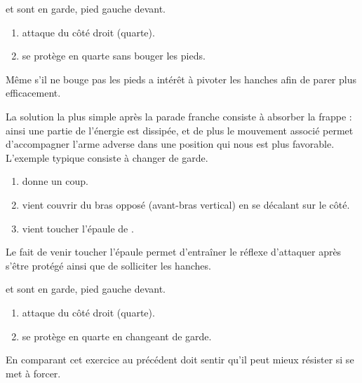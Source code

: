 \begin{exercice}

\A et \D sont en garde, pied gauche devant.

\begin{enumerate}
	\item \A attaque \D du côté droit (quarte).
	
	\item \D se protège en quarte sans bouger les pieds.
\end{enumerate}

Même s'il ne bouge pas les pieds \D a intérêt à pivoter les hanches afin de parer plus efficacement.

\end{exercice}


La solution la plus simple après la parade franche consiste à absorber la frappe : ainsi une partie de l'énergie est dissipée, et de plus le mouvement associé permet d'accompagner l'arme adverse dans une position qui nous est plus favorable.
L'exemple typique consiste à changer de garde.


\begin{exercice}

\begin{enumerate}
	\item \A donne un coup.
	
	\item \D vient couvrir du bras opposé (avant-bras vertical) en se décalant sur le côté.
	
	\item \D vient toucher l'épaule de \A.
\end{enumerate}

Le fait de venir toucher l'épaule permet d'entraîner le réflexe d'attaquer après s'être protégé ainsi que de solliciter les hanches.
\end{exercice}


\begin{exercice}

\A et \D sont en garde, pied gauche devant.

\begin{enumerate}
	\item \A attaque \D du côté droit (quarte).
	
	\item \D se protège en quarte en changeant de garde.
\end{enumerate}

En comparant cet exercice au précédent \D doit sentir qu'il peut mieux résister si \A se met à forcer.
\end{exercice}



